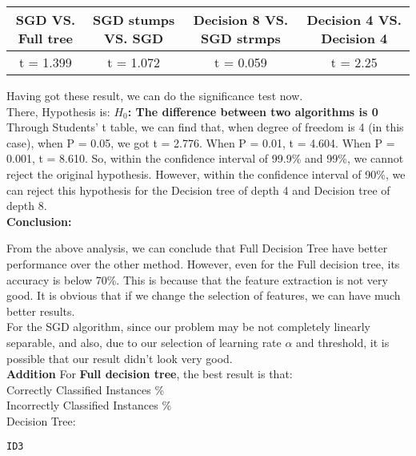 \begin{enumerate}
\begin{enumerate}
\begin{table}[H]
\begin{tabular}{|c|c|c|c|}
\hline
SGD VS. Full tree & SGD stumps VS. SGD & Decision 8 VS. SGD strmps & Decision 4 VS. Decision 4 \\
\hline
t = 1.399 & t = 1.072 & t = 0.059 & t = 2.25\\
\hline
\end{tabular}
\end{table}

Having got these result, we can do the significance test now. \\

There, Hypothesis is: {\bf $H_0$: The difference between two algorithms is 0}\\

Through Students' t table, we can find that, when degree of freedom is 4 (in this case), when P = 0.05, we got t = 2.776. When P = 0.01, t = 4.604. When P = 0.001, t = 8.610. So, within the confidence interval of 99.9\% and 99\%, we cannot reject the original hypothesis. However, within the confidence interval of 90\%, we can reject this hypothesis for the Decision tree of depth 4 and Decision tree of depth 8.\\


{\bf Conclusion:}

From the above analysis, we can conclude that Full Decision Tree have better performance over the other method. However, even for the Full decision tree, its accuracy is below 70\%. This is because that the feature extraction is not very good. It is obvious that if we change the selection of features, we can have much better results.\\ 

For the SGD algorithm, since our problem may be not completely linearly separable, and also, due to our selection of learning rate $\alpha$ and threshold, it is possible that our result didn't look very good.\\

{\bf Addition}
For {\bf Full decision tree}, the best result is that:\\
Correctly Classified Instances             \% \\
Incorrectly Classified Instances            \% \\

Decision Tree:
\begin{lstlisting}
ID3


\end{lstlisting}
\end{enumerate}
\end{enumerate}
